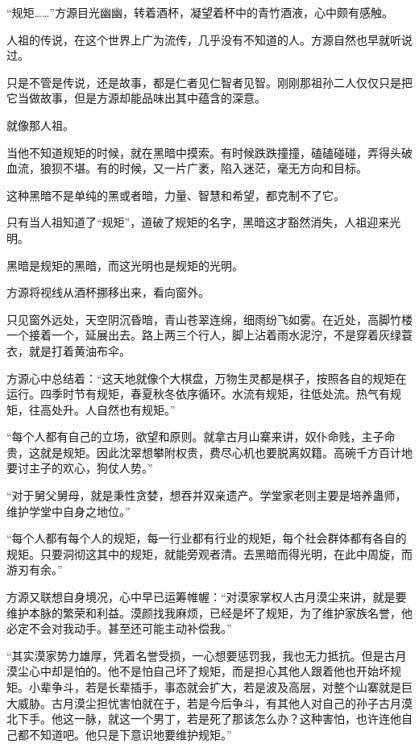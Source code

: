 \begin{this_body}
“规矩……”方源目光幽幽，转着酒杯，凝望着杯中的青竹酒液，心中颇有感触。

人祖的传说，在这个世界上广为流传，几乎没有不知道的人。方源自然也早就听说过。

只是不管是传说，还是故事，都是仁者见仁智者见智。刚刚那祖孙二人仅仅只是把它当做故事，但是方源却能品味出其中蕴含的深意。

就像那人祖。

当他不知道规矩的时候，就在黑暗中摸索。有时候跌跌撞撞，磕磕碰碰，弄得头破血流，狼狈不堪。有的时候，又一片广袤，陷入迷茫，毫无方向和目标。

这种黑暗不是单纯的黑或者暗，力量、智慧和希望，都克制不了它。

只有当人祖知道了“规矩”，道破了规矩的名字，黑暗这才豁然消失，人祖迎来光明。

黑暗是规矩的黑暗，而这光明也是规矩的光明。

方源将视线从酒杯挪移出来，看向窗外。

只见窗外远处，天空阴沉昏暗，青山苍翠连绵，细雨纷飞如雾。在近处，高脚竹楼一个接着一个，延展出去。路上两三个行人，脚上沾着雨水泥泞，不是穿着灰绿蓑衣，就是打着黄油布伞。

方源心中总结着：“这天地就像个大棋盘，万物生灵都是棋子，按照各自的规矩在运行。四季时节有规矩，春夏秋冬依序循环。水流有规矩，往低处流。热气有规矩，往高处升。人自然也有规矩。”

“每个人都有自己的立场，欲望和原则。就拿古月山寨来讲，奴仆命贱，主子命贵，这就是规矩。因此沈翠想攀附权贵，费尽心机也要脱离奴籍。高碗千方百计地要讨主子的欢心，狗仗人势。”

“对于舅父舅母，就是秉性贪婪，想吞并双亲遗产。学堂家老则主要是培养蛊师，维护学堂中自身之地位。”

“每个人都有每个人的规矩，每一行业都有行业的规矩，每个社会群体都有各自的规矩。只要洞彻这其中的规矩，就能旁观者清。去黑暗而得光明，在此中周旋，而游刃有余。”

方源又联想自身境况，心中早已运筹帷幄：“对漠家掌权人古月漠尘来讲，就是要维护本脉的繁荣和利益。漠颜找我麻烦，已经是坏了规矩，为了维护家族名誉，他必定不会对我动手。甚至还可能主动补偿我。”

“其实漠家势力雄厚，凭着名誉受损，一心想要惩罚我，我也无力抵抗。但是古月漠尘心中却是怕的。他不是怕自己坏了规矩，而是担心其他人跟着他也开始坏规矩。小辈争斗，若是长辈插手，事态就会扩大，若是波及高层，对整个山寨就是巨大威胁。古月漠尘担忧害怕就在于，若是今后争斗，有其他人对自己的孙子古月漠北下手。他这一脉，就这一个男丁，若是死了那该怎么办？这种害怕，也许连他自己都不知道吧。他只是下意识地要维护规矩。”


\end{this_body}
